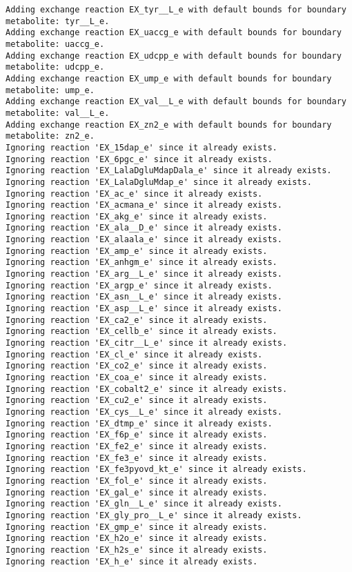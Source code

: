 \documentclass[
  letterpaper,
  DIV=11,
  numbers=noendperiod]{scrartcl}
\begin{document}
\begin{verbatim}
Adding exchange reaction EX_tyr__L_e with default bounds for boundary metabolite: tyr__L_e.
Adding exchange reaction EX_uaccg_e with default bounds for boundary metabolite: uaccg_e.
Adding exchange reaction EX_udcpp_e with default bounds for boundary metabolite: udcpp_e.
Adding exchange reaction EX_ump_e with default bounds for boundary metabolite: ump_e.
Adding exchange reaction EX_val__L_e with default bounds for boundary metabolite: val__L_e.
Adding exchange reaction EX_zn2_e with default bounds for boundary metabolite: zn2_e.
Ignoring reaction 'EX_15dap_e' since it already exists.
Ignoring reaction 'EX_6pgc_e' since it already exists.
Ignoring reaction 'EX_LalaDgluMdapDala_e' since it already exists.
Ignoring reaction 'EX_LalaDgluMdap_e' since it already exists.
Ignoring reaction 'EX_ac_e' since it already exists.
Ignoring reaction 'EX_acmana_e' since it already exists.
Ignoring reaction 'EX_akg_e' since it already exists.
Ignoring reaction 'EX_ala__D_e' since it already exists.
Ignoring reaction 'EX_alaala_e' since it already exists.
Ignoring reaction 'EX_amp_e' since it already exists.
Ignoring reaction 'EX_anhgm_e' since it already exists.
Ignoring reaction 'EX_arg__L_e' since it already exists.
Ignoring reaction 'EX_argp_e' since it already exists.
Ignoring reaction 'EX_asn__L_e' since it already exists.
Ignoring reaction 'EX_asp__L_e' since it already exists.
Ignoring reaction 'EX_ca2_e' since it already exists.
Ignoring reaction 'EX_cellb_e' since it already exists.
Ignoring reaction 'EX_citr__L_e' since it already exists.
Ignoring reaction 'EX_cl_e' since it already exists.
Ignoring reaction 'EX_co2_e' since it already exists.
Ignoring reaction 'EX_coa_e' since it already exists.
Ignoring reaction 'EX_cobalt2_e' since it already exists.
Ignoring reaction 'EX_cu2_e' since it already exists.
Ignoring reaction 'EX_cys__L_e' since it already exists.
Ignoring reaction 'EX_dtmp_e' since it already exists.
Ignoring reaction 'EX_f6p_e' since it already exists.
Ignoring reaction 'EX_fe2_e' since it already exists.
Ignoring reaction 'EX_fe3_e' since it already exists.
Ignoring reaction 'EX_fe3pyovd_kt_e' since it already exists.
Ignoring reaction 'EX_fol_e' since it already exists.
Ignoring reaction 'EX_gal_e' since it already exists.
Ignoring reaction 'EX_gln__L_e' since it already exists.
Ignoring reaction 'EX_gly_pro__L_e' since it already exists.
Ignoring reaction 'EX_gmp_e' since it already exists.
Ignoring reaction 'EX_h2o_e' since it already exists.
Ignoring reaction 'EX_h2s_e' since it already exists.
Ignoring reaction 'EX_h_e' since it already exists.

\end{verbatim}
\end{document}
